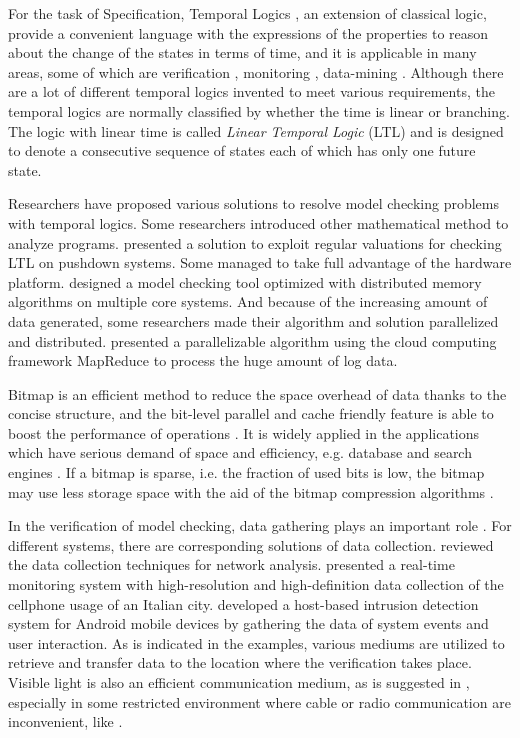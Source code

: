 For the task of Specification, Temporal Logics \citep{huth2004}, an extension of classical logic, provide a convenient language with the expressions of the properties to reason about the change of the states in terms of time, and it is applicable in many areas, some of which are verification \citep{clarke1986automatic}, monitoring \citep{basin2010policy}, data-mining \citep{van2005process}. Although there are a lot of different temporal logics invented to meet various requirements, the temporal logics are normally classified by whether the time is linear or branching. The logic with linear time is called \emph{Linear Temporal Logic} (LTL) \citep{pnueli97} and is designed to denote a consecutive sequence of states each of which has only one future state.

Researchers have proposed various solutions to resolve model checking problems with temporal logics. Some researchers introduced other mathematical method to analyze programs. \cite{esparza2001model} presented a solution to exploit regular valuations for checking LTL on pushdown systems. Some managed to take full advantage of the hardware platform. \cite{barnat2007scalable} designed a model checking tool optimized with distributed memory algorithms on multiple core systems. And because of the increasing amount of data generated, some researchers made their algorithm and solution parallelized and distributed. \cite{barre2012mapreduce} presented a parallelizable algorithm using the cloud computing framework MapReduce to process the huge amount of log data.

Bitmap is an efficient method to reduce the space overhead of data thanks to the concise structure, and the bit-level parallel and cache friendly feature is able to boost the performance of operations \citep{culpepper2010efficient}. It is widely applied in the applications which have serious demand of space and efficiency, e.g. database and search engines \citep{lemire2014}. If a bitmap is sparse, i.e. the fraction of used bits is low, the bitmap may use less storage space with the aid of the bitmap compression algorithms \citep{antoshenkov1995byte}.

In the verification of model checking, data gathering plays an important role \citep{casley1988collection}. For different systems, there are corresponding solutions of data collection. \cite{zwijze2005auditing} reviewed the data collection techniques for network analysis. \cite{calabrese2011real} presented a real-time monitoring system with high-resolution and high-definition data collection of the cellphone usage of an Italian city. \cite{shabtai2010applying} developed a host-based intrusion detection system for Android mobile devices by gathering the data of system events and user interaction. As is indicated in the examples, various mediums are utilized to retrieve and transfer data to the location where the verification takes place. Visible light is also an efficient communication medium, as is suggested in \cite{komine2004fundamental}, especially in some restricted environment where cable or radio communication are inconvenient, like \cite{vasilescu2005data}.

